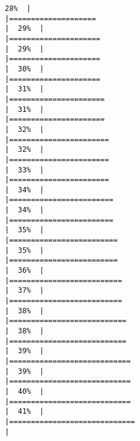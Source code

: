 \documentclass[
]{book}
\begin{document}
\begin{verbatim}
28%  |                                                                              |====================                                                  |  29%  |                                                                              |=====================                                                 |  29%  |                                                                              |=====================                                                 |  30%  |                                                                              |=====================                                                 |  31%  |                                                                              |======================                                                |  31%  |                                                                              |======================                                                |  32%  |                                                                              |=======================                                               |  32%  |                                                                              |=======================                                               |  33%  |                                                                              |=======================                                               |  34%  |                                                                              |========================                                              |  34%  |                                                                              |========================                                              |  35%  |                                                                              |=========================                                             |  35%  |                                                                              |=========================                                             |  36%  |                                                                              |==========================                                            |  37%  |                                                                              |==========================                                            |  38%  |                                                                              |===========================                                           |  38%  |                                                                              |===========================                                           |  39%  |                                                                              |============================                                          |  39%  |                                                                              |============================                                          |  40%  |                                                                              |============================                                          |  41%  |                                                                              |=============================                                         |  
\end{verbatim}
\end{document}
